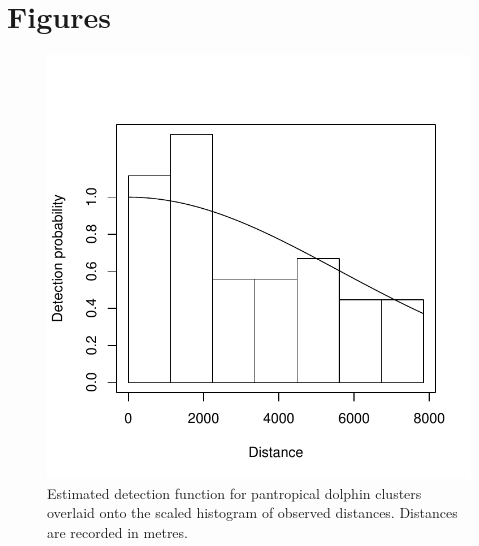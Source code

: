 \documentclass[a4paper,12pt]{article}
\begin{document}
\newpage




\newpage


\newpage


\section*{Figures}

\begin{figure}[h!]
  \caption{Estimated detection function for pantropical dolphin clusters overlaid onto the scaled histogram of observed distances. Distances are recorded in metres.}
  \label{dolphin-df}
  \begin{center}
    \includegraphics[width=\textwidth]{distances}
  \end{center}
\end{figure}

\newpage
\end{document}
